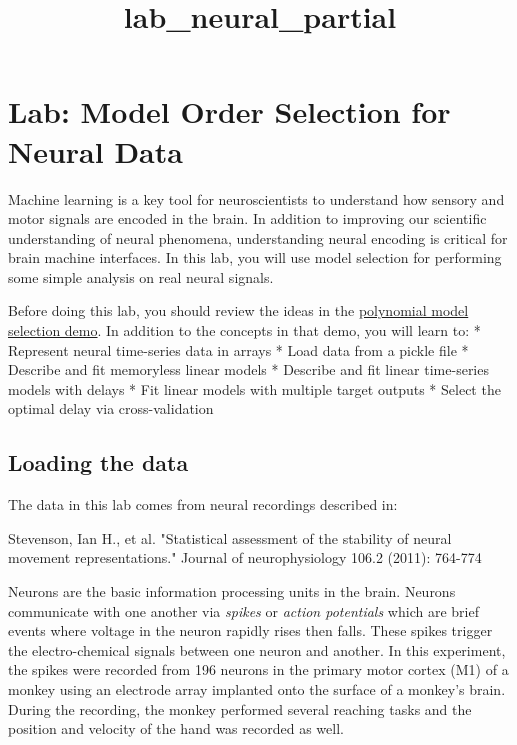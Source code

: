 \documentclass[11pt]{article}
\title{lab\_neural\_partial}
\begin{document}
    
    
    \maketitle
    
    

    
    \section{Lab: Model Order Selection for Neural
Data}\label{lab-model-order-selection-for-neural-data}

Machine learning is a key tool for neuroscientists to understand how
sensory and motor signals are encoded in the brain. In addition to
improving our scientific understanding of neural phenomena,
understanding neural encoding is critical for brain machine interfaces.
In this lab, you will use model selection for performing some simple
analysis on real neural signals.

Before doing this lab, you should review the ideas in the
\href{./polyfit.ipynb}{polynomial model selection demo}. In addition to
the concepts in that demo, you will learn to: * Represent neural
time-series data in arrays * Load data from a pickle file * Describe and
fit memoryless linear models * Describe and fit linear time-series
models with delays * Fit linear models with multiple target outputs *
Select the optimal delay via cross-validation

    \subsection{Loading the data}\label{loading-the-data}

The data in this lab comes from neural recordings described in:

 Stevenson, Ian H., et al. "Statistical assessment of the stability of
neural movement representations." Journal of neurophysiology 106.2
(2011): 764-774

Neurons are the basic information processing units in the brain. Neurons
communicate with one another via \emph{spikes} or \emph{action
potentials} which are brief events where voltage in the neuron rapidly
rises then falls. These spikes trigger the electro-chemical signals
between one neuron and another. In this experiment, the spikes were
recorded from 196 neurons in the primary motor cortex (M1) of a monkey
using an electrode array implanted onto the surface of a monkey's brain.
During the recording, the monkey performed several reaching tasks and
the position and velocity of the hand was recorded as well.
\end{document}
